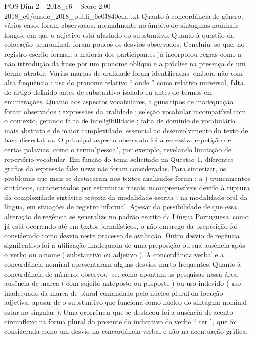\begin{textsample}{POS Dim 2 – 2018\_c6 – Score 2.00 – 2018\_c6/enade\_2018\_publi\_6e03840cda.txt}
Quanto à concordância de gênero, vários casos foram observados, normalmente no âmbito de sintagmas nominais longos, em que o adjetivo está afastado do substantivo.
Quanto à questão da colocação pronominal, foram poucos os desvios observados.
Concluiu -se que, no registro escrito formal, a maioria dos participantes já incorporou regras como a não introdução da frase por um pronome oblíquo e a próclise na presença de um termo atrator.
Várias marcas de oralidade foram identificadas, embora não com alta frequência : uso do pronome relativo “ onde ” como relativo universal, falta de artigo definido antes de substantivo isolado ou antes de termos em enumerações.
Quanto aos aspectos vocabulares, alguns tipos de inadequação foram observados : expressões da oralidade ; seleção vocabular incompatível com o contexto, gerando falta de inteligibilidade ; falta de domínio de vocabulário mais abstrato e de maior complexidade, essencial ao desenvolvimento do texto de base dissertativa.
O principal aspecto observado foi a excessiva repetição de certas palavras, como o termo"pessoa", por exemplo, revelando limitação de repertório vocabular.
Em função do tema solicitado na Questão 1, diferentes grafias da expressão fake news não foram consideradas.
Para sintetizar, os problemas que mais se destacaram nos textos analisados foram : a ) truncamentos sintáticos, caracterizados por estruturas frasais incompreensíveis devido à ruptura da complexidade sintática própria da modalidade escrita ; na modalidade oral da língua, em situações de registro informal.
Apesar da possibilidade de que essa alteração de regência se generalize no padrão escrito da Língua Portuguesa, como já está ocorrendo até em textos jornalísticos, o não emprego da preposição foi considerado como desvio neste processo de avaliação.
Outro desvio de regência significativo foi a utilização inadequada de uma preposição ou sua ausência após o verbo ou o nome ( substantivo ou adjetivo ).
A concordância verbal e a concordância nominal apresentaram alguns desvios muito frequentes.
Quanto à concordância de número, observou -se, como apontam as pesquisas nessa área, ausência de marca ( com sujeito anteposto ou posposto ) ou uso indevido ( uso inadequado da marca de plural comandado pelo núcleo plural da locução adjetiva, apesar de o substantivo que funciona como núcleo do sintagma nominal estar no singular ).
Uma ocorrência que se destacou foi a ausência de acento circunflexo na forma plural do presente do indicativo do verbo “ ter ”, que foi considerada como um desvio na concordância verbal e não na acentuação gráfica.

\end{textsample}
